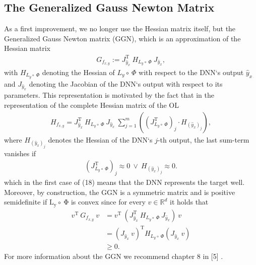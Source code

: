 \documentclass[conference]{IEEEtran}
\begin{document}
	\subsection{The Generalized Gauss Newton Matrix}
	As a first improvement, we no longer use the Hessian matrix itself, but the Generalized Gauss Newton matrix (GGN), which is an approximation of the Hessian matrix
	\begin{align}
	G_{f_{x, y}} := J_{\hat{y}_{x}}^{\mathrm{T}}\:H_{L_{y}\circ\:\Phi}\:J_{\hat{y}_{x}},
	\end{align}
	with $H_{L_{y}\circ\:\Phi}$ denoting the Hessian of $L_{y}\circ\:\Phi$ with respect to the DNN`s output $\hat{y}_{x}$ and $J_{\hat{y}_{x}}$ denoting the Jacobian of the DNN`s output with respect to its parameters.
	This representation is motivated by the fact that in the representation of the complete Hessian matrix of the OL
	\begin{align}
	H_{f_{x, y}} = J_{\hat{y}_{x}}^{\mathrm{T}}\:H_{L_{y}\circ\:\Phi}\:J_{\hat{y}_{x}}\:\sum_{j = 1}^{m}\left(\left(J_{L_{y}\circ \:\Phi}^{\mathrm{T}}\right)_{j}\cdot H_{(\hat{y}_{x})_{j}}\right),
	\end{align}
	where $H_{(\hat{y}_{x})_{j}}$ denotes the Hessian of the DNN`s  $j$-th output, the last sum-term vanishes if 
	\begin{align}
	\left(J_{L_{y}\circ \:\Phi}^{\mathrm{T}}\right)_{j}\approx 0\:\lor\:H_{(\hat{y}_{x})_{j}} \approx 0.
	\end{align}
	which in the first case of (18) means that the DNN represents the target well.  Moreover, by construction, the GGN is a symmetric matrix and is positive semidefinite if $\mathrm{L_{y}\circ\:\Phi}$ is convex since for every $v\in\mathbb{R}^{d}$ it holds that
	\begin{align}
	v^{\mathrm{T}}\:G_{f_{x, y}}\:v &= v^{\mathrm{T}}\:\left( J_{\hat{y}_{x}}^{\mathrm{T}}\:H_{L_{y}\circ\:\Phi}\:J_{\hat{y}_{x}}\right)\:v\\
	&= \left(J_{\hat{y}_{x}}\:v\right)^{\mathrm{T}}H_{L_{y}\circ\:\Phi}\left(J_{\hat{y}_{x}}\:v\right) \\
	&\geq 0.
	\end{align}
	For more information about the GGN we recommend chapter 8 in [5] .
	
\end{document}
